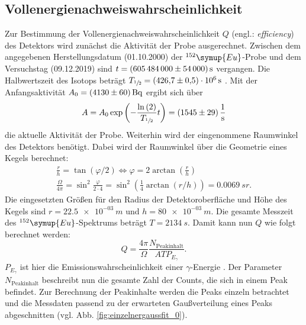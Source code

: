 \FloatBarrier
\subsection{Vollenergienachweiswahrscheinlichkeit}
Zur Bestimmung der Vollenergienachweiswahrscheinlichkeit $Q$ (engl.: \textit{efficiency}) des Detektors wird zunächst die Aktivität der Probe ausgerechnet.
Zwischen dem angegebenen Herstellungsdatum (01.10.2000) \cite{anleitung} der $^{152}\symup{Eu}$-Probe und dem Versuchstag (09.12.2019) sind $t = \SI{605484000 (54000)}{s}$ vergangen.
Die Halbwertszeit des Isotops beträgt $T_{\sfrac{1}{2}} = \SI{426.7 (5) e+06}{s}$ \cite{nucleide}.
Mit der Anfangsaktivität $A_{0} = \SI{4130 (60)}{Bq}$ ergibt sich über
\begin{equation}
	A = A_{0} \exp{\left( - \frac{\ln{(2)}}{T_{\sfrac{1}{2}}} t \right)} = \SI{1545(29)}{\per \second}
	\label{result:aktivität}
\end{equation}
die aktuelle Aktivität der Probe.
Weiterhin wird der eingenommene Raumwinkel des Detektors benötigt.
Dabei wird der Raumwinkel über die Geometrie eines Kegels berechnet:
\begin{align*}
	\frac{r}{h} = \tan{( \varphi / 2 )} \Leftrightarrow \varphi = 2 \arctan{(\frac{r}{h})} \\
	\frac{\Omega}{4 \pi} = \sin^2{\frac{\varphi}{2 \cdot 4}} =  \sin^2{ \left( \frac{1}{4} \arctan{(r/h)} \right)} = \SI{0.0069}{sr}.
	\label{result:raumwinkel}
\end{align*}
Die eingesetzten Größen für den Radius der Detektoroberfläche und Höhe des Kegels sind $r = \SI{22.5e-03}{m}$ und $h = \SI{80e-03}{m}$.
Die gesamte Messzeit des $^{152}\symup{Eu}$-Spektrums beträgt $T=\SI{2134}{s}$.
Damit kann nun $Q$ wie folgt berechnet werden:
\begin{equation}
	Q = \frac{4 \pi}{\Omega} \frac{N_{\text{Peakinhalt}}}{ A T P_{E_{\gamma}}}.
\end{equation}
$P_{E_{\gamma}}$ ist hier die Emissionswahrscheinlichkeit einer $\gamma$-Energie \cite{nucleide}.
Der Parameter $N_{\text{Peakinhalt}}$ beschreibt nun die gesamte Zahl der Counts, die sich in einem Peak befindet.
Zur Berechnung der Peakinhalte werden die Peaks einzeln betrachtet und die Messdaten passend zu der erwarteten Gaußverteilung eines Peaks abgeschnitten (vgl. Abb. \ref{fig:einzelnergaussfit_0}).
